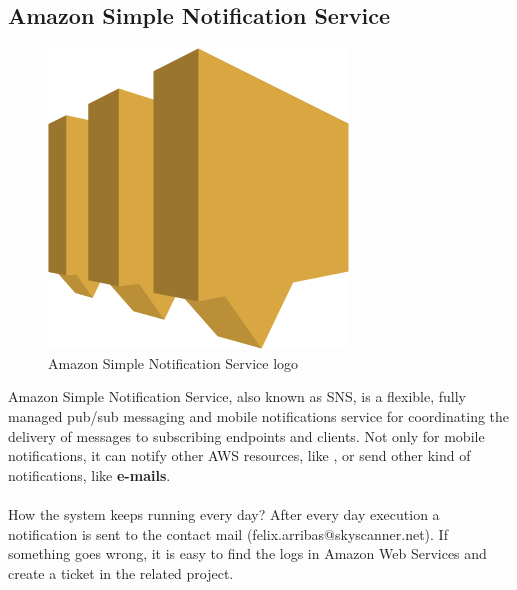 \subsection*{Amazon Simple Notification Service} \label{sns}
\begin{figure}[H]
\centering
\includegraphics[scale=0.1]{resources/sns-logo.png}
\caption{Amazon Simple Notification Service logo}
\end{figure}

Amazon Simple Notification Service\cite{sns}, also known as SNS, is a flexible, fully managed pub/sub messaging and mobile notifications service for coordinating the delivery of messages to subscribing endpoints and clients. Not only for mobile notifications, it can notify other AWS resources, like , or send other kind of notifications, like \textbf{e-mails}.
\\\\
How the system keeps running every day? After every day execution a notification is sent to the contact mail (felix.arribas@skyscanner.net). If something goes wrong, it is easy to find the logs in Amazon Web Services and create a ticket in the related project.




